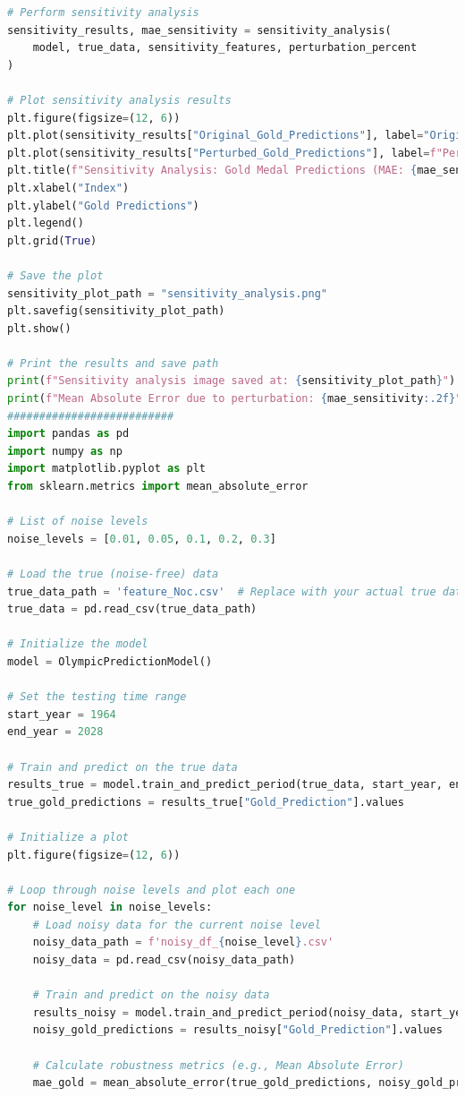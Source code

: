 \documentclass[12pt]{article}
\begin{document}
\begin{lstlisting}[language=Python, style=mystyle, caption=robust\_sensitivity.ipynb]
# Perform sensitivity analysis
sensitivity_results, mae_sensitivity = sensitivity_analysis(
    model, true_data, sensitivity_features, perturbation_percent
)

# Plot sensitivity analysis results
plt.figure(figsize=(12, 6))
plt.plot(sensitivity_results["Original_Gold_Predictions"], label="Original Predictions", marker="o")
plt.plot(sensitivity_results["Perturbed_Gold_Predictions"], label=f"Perturbed Predictions (+{perturbation_percent}%)", marker="x", linestyle="--")
plt.title(f"Sensitivity Analysis: Gold Medal Predictions (MAE: {mae_sensitivity:.2f})")
plt.xlabel("Index")
plt.ylabel("Gold Predictions")
plt.legend()
plt.grid(True)

# Save the plot
sensitivity_plot_path = "sensitivity_analysis.png"
plt.savefig(sensitivity_plot_path)
plt.show()

# Print the results and save path
print(f"Sensitivity analysis image saved at: {sensitivity_plot_path}")
print(f"Mean Absolute Error due to perturbation: {mae_sensitivity:.2f}")
##########################
import pandas as pd
import numpy as np
import matplotlib.pyplot as plt
from sklearn.metrics import mean_absolute_error

# List of noise levels
noise_levels = [0.01, 0.05, 0.1, 0.2, 0.3]

# Load the true (noise-free) data
true_data_path = 'feature_Noc.csv'  # Replace with your actual true data path
true_data = pd.read_csv(true_data_path)

# Initialize the model
model = OlympicPredictionModel()

# Set the testing time range
start_year = 1964
end_year = 2028

# Train and predict on the true data
results_true = model.train_and_predict_period(true_data, start_year, end_year)
true_gold_predictions = results_true["Gold_Prediction"].values

# Initialize a plot
plt.figure(figsize=(12, 6))

# Loop through noise levels and plot each one
for noise_level in noise_levels:
    # Load noisy data for the current noise level
    noisy_data_path = f'noisy_df_{noise_level}.csv'
    noisy_data = pd.read_csv(noisy_data_path)
    
    # Train and predict on the noisy data
    results_noisy = model.train_and_predict_period(noisy_data, start_year, end_year)
    noisy_gold_predictions = results_noisy["Gold_Prediction"].values
    
    # Calculate robustness metrics (e.g., Mean Absolute Error)
    mae_gold = mean_absolute_error(true_gold_predictions, noisy_gold_predictions)
    

\end{lstlisting}
\end{document}
